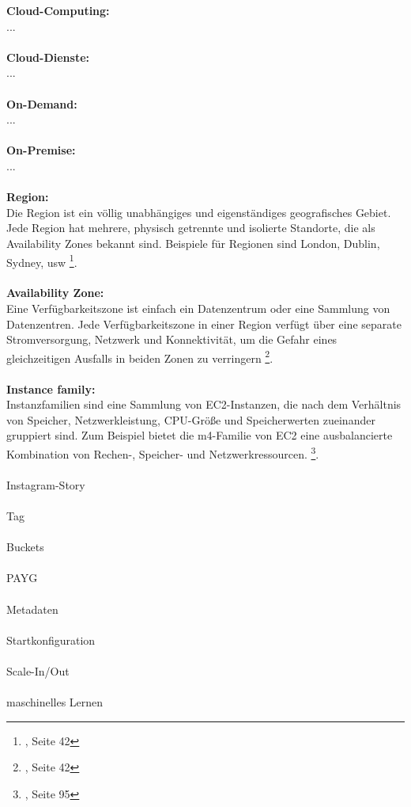 

\textbf{Cloud-Computing:}\\
...
\\\\
\textbf{Cloud-Dienste:}\\
...
\\\\
\textbf{On-Demand:}\\
...
\\\\
\textbf{On-Premise:}\\
...
\\\\
\textbf{Region:}\\
Die Region ist ein völlig unabhängiges und eigenständiges geografisches Gebiet. Jede Region hat mehrere, physisch getrennte und isolierte Standorte, die als Availability Zones bekannt sind. Beispiele für Regionen sind London, Dublin, Sydney, usw \footnote{\cite{AWS1}, Seite 42}.
\\\\
\textbf{Availability Zone:}\\
Eine Verfügbarkeitszone ist einfach ein Datenzentrum oder eine Sammlung von Datenzentren. Jede Verfügbarkeitszone in einer Region verfügt über eine separate Stromversorgung, Netzwerk und Konnektivität, um die Gefahr eines gleichzeitigen Ausfalls in beiden Zonen zu verringern \footnote{\cite{AWS1}, Seite 42}.
\\\\

\textbf{Instance family:}\\
Instanzfamilien sind eine Sammlung von EC2-Instanzen, die nach dem Verhältnis von Speicher, Netzwerkleistung, CPU-Größe und Speicherwerten zueinander gruppiert sind. Zum Beispiel bietet die m4-Familie von EC2 eine ausbalancierte Kombination von Rechen-, Speicher- und Netzwerkressourcen. \footnote{\cite{AWS1}, Seite 95}.
\\\\
Instagram-Story
\\\\
Tag
\\\\
Buckets
\\\\
PAYG %
\\\\
Metadaten
\\\\
Startkonfiguration %
\\\\
Scale-In/Out
\\\\
maschinelles Lernen
